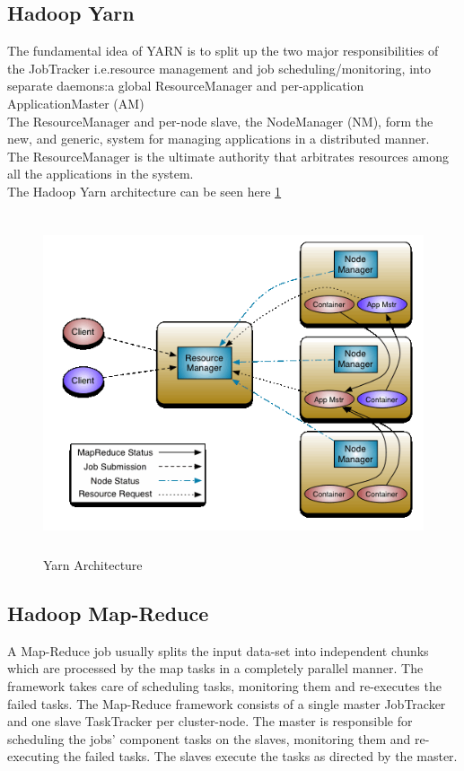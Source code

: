 \documentclass[12pt]{book}
\begin{document}
\subsection{Hadoop Yarn}
The fundamental idea of YARN is to split up the two major responsibilities of the JobTracker i.e.resource management and 
job scheduling/monitoring, into separate daemons:a global ResourceManager and per-application ApplicationMaster (AM)\\
The ResourceManager and per-node slave, the NodeManager (NM), form the new, and generic, system for managing applications 
in a distributed manner.\\ The ResourceManager is the ultimate authority that arbitrates resources among all the applications in the system.\\
The Hadoop Yarn architecture can be seen here \ref{fig:fig1_yarn}
\begin{figure}[ht]
 \centering
 \includegraphics[height=10cm,width=15cm]{./yarn_archi.png}
 \caption{Yarn Architecture\label{fig:fig1_yarn} \cite{yarn}}
\end{figure}
\subsection{Hadoop Map-Reduce}\cite{mapreduce} 
A Map-Reduce job usually splits the input data-set into independent chunks which are processed by the map tasks in a completely parallel manner.
The framework takes care of scheduling tasks, monitoring them and re-executes the failed tasks.
The Map-Reduce framework consists of a single master JobTracker and one slave TaskTracker per cluster-node. The master is responsible for scheduling the jobs' component tasks on the slaves, monitoring them and re-executing the failed tasks. 
The slaves execute the tasks as directed by the master.
\end{document}
